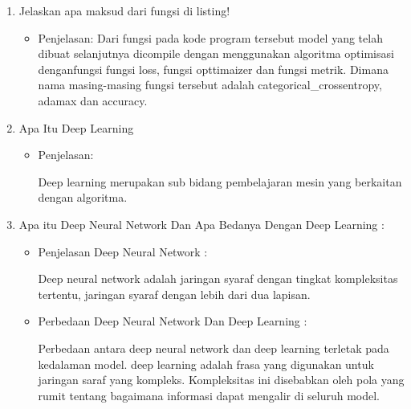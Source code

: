 \begin{enumerate}
\item Jelaskan apa maksud dari fungsi di listing!

\begin{itemize}
\item Penjelasan: Dari fungsi pada kode program tersebut model yang telah dibuat selanjutnya dicompile dengan menggunakan algoritma optimisasi denganfungsi fungsi loss, fungsi opttimaizer dan fungsi metrik. Dimana nama masing-masing fungsi tersebut adalah categorical\_crossentropy, adamax dan accuracy.
\par 
\end{itemize}
\par
\par

\item 	Apa Itu Deep Learning
\begin{itemize}
\item Penjelasan: 
\par  Deep learning merupakan sub bidang pembelajaran mesin yang berkaitan dengan algoritma.
\end{itemize}
\par
\par

\item Apa itu Deep Neural Network Dan Apa Bedanya Dengan Deep Learning :
\begin{itemize}
\item Penjelasan Deep Neural Network : 
\par  Deep neural network adalah jaringan syaraf dengan tingkat kompleksitas tertentu, jaringan syaraf dengan lebih dari dua lapisan.
\par
\item Perbedaan Deep Neural Network Dan Deep Learning :
\par Perbedaan antara deep neural network dan deep learning terletak pada kedalaman model. deep learning adalah frasa yang digunakan untuk jaringan saraf yang kompleks. Kompleksitas ini disebabkan oleh pola yang rumit tentang bagaimana informasi dapat mengalir di seluruh model.
\end{itemize}
\par
\par


\end{enumerate}
